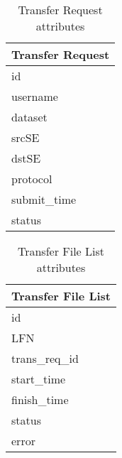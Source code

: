\begin{table}
    \caption{\label{tab:tranreq}Transfer Request attributes}
    \begin{center}
\begin{tabular}{l}
    \textbf{Transfer Request}
    \\
    \hline
    id \\
    username \\
    dataset \\
    srcSE \\
    dstSE \\
    protocol \\
    submit\_time \\
    status \\
\end{tabular}
    \end{center}
\end{table}

\begin{table}
    \caption{\label{tab:tranfiles}Transfer File List attributes}
    \begin{center}
\begin{tabular}{l}
    \textbf{Transfer File List}
    \\
    \hline
    id \\
    LFN \\
    trans\_req\_id \\
    start\_time \\
    finish\_time \\
    status \\
    error
\end{tabular}
    \end{center}
\end{table}

